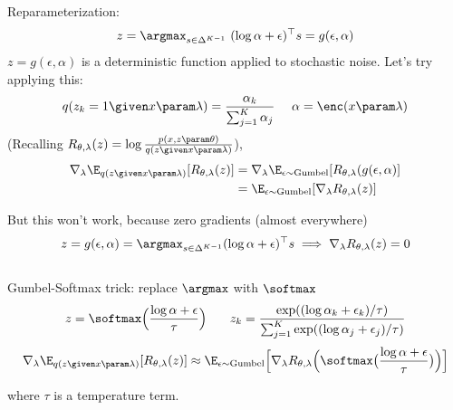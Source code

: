 \begin{frame}

Reparameterization:
\[ z = \argmax_{s \in \Delta^{K-1}}  \,\,(\log \alpha + \epsilon)^\top s = g(\epsilon, \alpha) \]
$z = g(\epsilon, \alpha)$ is a deterministic function applied to stochastic noise. Let's try applying this: \\ 

\[ q(z_k = 1 \given x \param \lambda) = \frac{\alpha_k}{\sum_{j=1}^K \alpha_j} \,\,\,\,\,\,\,\, \alpha = \enc(x \param \lambda) \]
\pause 
(Recalling $R_{\theta, \lambda}(z) =  \log \frac{p(x, z \param \theta)}{q(z \given x \param \lambda)}$),
\begin{align*}
    \nabla_\lambda \E_{q(z \given x \param \lambda)}[R_{\theta, \lambda}(z)]  &= 
    \nabla_\lambda \E_{\epsilon \sim \text{Gumbel}}[R_{\theta, \lambda}(g(\epsilon, \alpha)] \\
    &=      \E_{\epsilon \sim \text{Gumbel}}[\nabla_\lambda R_{\theta, \lambda}(z)]
\end{align*}
\end{frame}

\begin{frame}
But this won't work, because zero gradients (almost everywhere)
\[ z = g(\epsilon, \alpha) = \argmax_{s \in \Delta^{K-1}} (\log \alpha + \epsilon)^\top s \implies \nabla_\lambda R_{\theta, \lambda}(z) = 0\]
\pause
\\ \vspace{3mm}
Gumbel-Softmax trick: replace $\argmax$ with $\softmax$
\[ z = \softmax\Big(\frac{\log \alpha + \epsilon}{\tau}\Big) \,\,\,\,\,\,\,\,\,\,\, z_k = \frac{\exp((\log \alpha_k + \epsilon_k)/\tau)}{\sum_{j=1}^K \exp ((\log \alpha_j + \epsilon_j)/\tau)} \]
\pause
\begin{align*} 
  \nabla_\lambda \E_{q(z \given x \param \lambda)}[R_{\theta, \lambda}(z)] \approx 
\E_{ \epsilon \sim \text{Gumbel}}\Big[\nabla_\lambda R_{\theta, \lambda}\Big(\softmax\big(\frac{\log \alpha + \epsilon}{\tau}\big)\Big) \Big]
\end{align*}

where $\tau$ is a temperature term. 
\end{frame}

